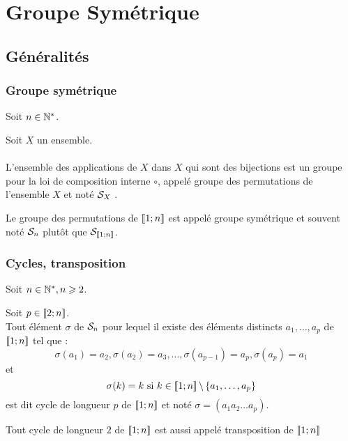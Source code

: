 \chapter{Groupe Symétrique}

\minitoc
\section{Généralités}
\subsection{Groupe symétrique}
    Soit \(n \in \Ns\).
\begin{defprop}
    Soit \(X\) un ensemble.\\~\\
    L’ensemble des applications de \(X\) dans \(X\) qui sont des bijections est un groupe pour la loi de composition interne \(\circ\), appelé groupe des permutations de l’ensemble \(X\) et noté \(\cal{S}_X\) .
\end{defprop}
\begin{defprop}
    Le groupe des permutations de \(\interventierii{1}{n}\) est appelé groupe symétrique et souvent noté \(\cal{S}_n\) plutôt que \(\cal{S}_{\interventierii{1}{n}}\).
\end{defprop}
\subsection{Cycles, transposition}
    Soit \(n \in \Ns, n \geq 2\).
\begin{defprop}
    Soit \(p \in \interventierii{2}{n}\).\\
    Tout élément \( \sigma\) de \(\cal{S}_n\) pour lequel il existe des éléments distincts \(a_1,\dots , a_p\) de \(\interventierii{1}{n}\) tel que :
    \[\sigma (a_1) = a_2, \sigma (a_2) = a_3,\dots , \sigma (a_{p-1}) = a_p, \sigma (a_p) = a_1\]
    et
    \[\sigma(k) = k \text{ si } k \in \interventierii{1}{n} \pd \accol{a_1,\dots , a_p}\]
    est dit cycle de longueur \(p\) de \(\interventierii{1}{n}\) et noté \(\sigma = (a_1a_2\dots a_p)\).
\end{defprop}
\begin{defprop}[Transposition] 
    Tout cycle de longueur \(2\) de \(\interventierii{1}{n}\) est aussi appelé transposition de \(\interventierii{1}{n}\)
\end{defprop}
